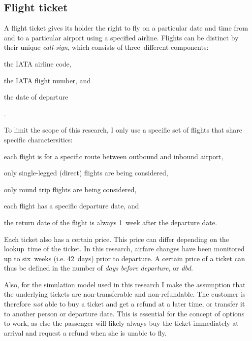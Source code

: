 \subsection{Flight ticket}
\label{subsec:FlightTicket}
A flight ticket gives its holder the right to fly on a particular date and time from and to a particular airport using a specified airline. Flights can be distinct by their unique \emph{call-sign}, which consists of three~different components: \begin{inparaenum}
\item the IATA airline code,
\item the IATA flight number, and
\item the date of departure
\end{inparaenum}.

To limit the scope of this research, I only use a specific set of flights that share specific charactersitics:

\begin{compactitem}
\item each flight is for a specific route between outbound and inbound airport,
\item only single-legged (direct) flights are being considered,
\item only round trip flights are being considered,
\item each flight has a specific departure date, and
\item the return date of the flight is always 1~week after the departure date.
\end{compactitem}
\vspace{1em}

Each ticket also has a certain price. This price can differ depending on the lookup~time of the ticket. In this research, airfare changes have been monitored up to six~weeks (i.e. 42~days) prior to departure. A certain price of a ticket can thus be defined in the number of \emph{days before departure}, or \emph{dbd}.

Also, for the simulation model used in this research I make the assumption that the underlying tickets are non-transferable and non-refundable. The customer is therefore \emph{not} able to buy a ticket and get a refund at a later time, or transfer it to another person or departure date. This is essential for the concept of options to work, as else the passenger will likely always buy the ticket immediately at arrival and request a refund when she is unable to fly.

